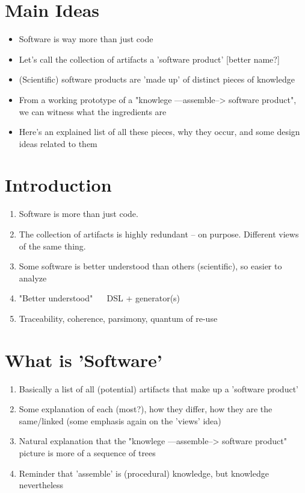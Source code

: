 \documentclass[10pt,conference]{IEEEtran}
\begin{document}
\section{Main Ideas}
\begin{itemize}
\item Software is way more than just code
\item Let's call the collection of artifacts a 'software product' [better name?]
\item (Scientific) software products are 'made up' of distinct pieces of knowledge
\item From a working prototype of a "knowlege ---assemble--> software product", we can witness what the ingredients are
\item Here's an explained list of all these pieces, why they occur, and some design ideas related to them 
\end{itemize}

\section{Introduction}
\begin{enumerate}
  \item Software is more than just code.
  \item The collection of artifacts is highly redundant -- on purpose. Different views of the same thing.
  \item Some software is better understood than others (scientific), so easier to analyze
  \item "Better understood" ~~ DSL + generator(s)
  \item Traceability, coherence, parsimony, quantum of re-use 
\end{enumerate}

\section{What is 'Software'}
\begin{enumerate}
  \item Basically a list of all (potential) artifacts that make up a 'software product'
  \item Some explanation of each (most?), how they differ, how they are the same/linked
    (some emphasis again on the 'views' idea)
  \item Natural explanation that the "knowlege ---assemble--> software product" picture is more of a sequence of trees
  \item Reminder that 'assemble' is (procedural) knowledge, but knowledge nevertheless 
\end{enumerate}
\end{document}
